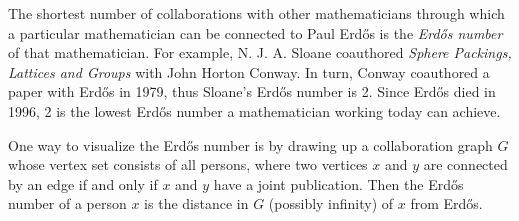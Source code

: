 \documentclass[12pt]{article}
\begin{document}
The shortest number of collaborations with other mathematicians through which a particular mathematician can be connected to Paul Erd\H{o}s is the {\em Erd\H{o}s number} of that mathematician. For example, N. J. A. Sloane coauthored {\it Sphere Packings, Lattices and Groups} with John Horton Conway. In turn, Conway coauthored a paper with Erd\H{o}s in 1979, thus Sloane's Erd\H{o}s number is 2. Since Erd\H{o}s died in 1996, 2 is the lowest Erd\H{o}s number a mathematician working today can achieve.

One way to visualize the Erd\H{o}s number is by drawing up a collaboration graph $G$ whose vertex set consists of all persons, where two vertices $x$ and $y$ are connected by an edge if and only if $x$ and $y$ have a joint publication.  Then the Erd\H{o}s number of a person $x$ is the distance in $G$ (possibly infinity) of $x$ from Erd\H{o}s.

\end{document}
